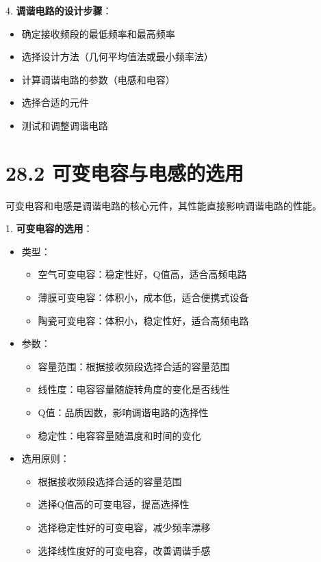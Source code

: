 \documentclass[12pt,UTF8]{ctexbook}
\begin{document}
4. \textbf{调谐电路的设计步骤}：
   \begin{itemize}[leftmargin=3.5em]
   \item 确定接收频段的最低频率和最高频率
   \item 选择设计方法（几何平均值法或最小频率法）
   \item 计算调谐电路的参数（电感和电容）
   \item 选择合适的元件
   \item 测试和调整调谐电路
   \end{itemize}

\section*{28.2 可变电容与电感的选用}

可变电容和电感是调谐电路的核心元件，其性能直接影响调谐电路的性能。

1. \textbf{可变电容的选用}：
   \begin{itemize}[leftmargin=3.5em]
   \item 类型：
     \begin{itemize}
     \item 空气可变电容：稳定性好，Q值高，适合高频电路
     \item 薄膜可变电容：体积小，成本低，适合便携式设备
     \item 陶瓷可变电容：体积小，稳定性好，适合高频电路
     \end{itemize}
   \item 参数：
     \begin{itemize}
     \item 容量范围：根据接收频段选择合适的容量范围
     \item 线性度：电容容量随旋转角度的变化是否线性
     \item Q值：品质因数，影响调谐电路的选择性
     \item 稳定性：电容容量随温度和时间的变化
     \end{itemize}
   \item 选用原则：
     \begin{itemize}
     \item 根据接收频段选择合适的容量范围
     \item 选择Q值高的可变电容，提高选择性
     \item 选择稳定性好的可变电容，减少频率漂移
     \item 选择线性度好的可变电容，改善调谐手感
     \end{itemize}
   \end{itemize}
\end{document}

